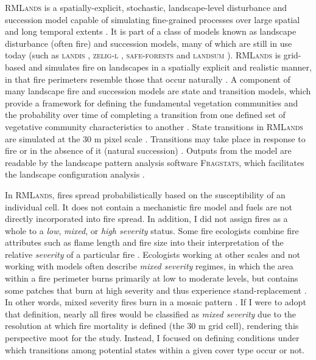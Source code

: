 \textsc{RMLands} is a spatially-explicit, stochastic, landscape-level disturbance and succession model capable of simulating fine-grained processes over large spatial and long temporal extents \citep{McGarigal2005}. It is part of a class of models known as landscape disturbance (often fire) and succession models, many of which are still in use today (such as \textsc{landis} \citep{He1999}, \textsc{zelig-l} \citep{Miller1999}, \textsc{safe-forests} \citep{Sessions1997} and \textsc{landsum} \citep{Keane2012}). \textsc{RMLands} is grid-based and simulates fire on landscapes in a spatially explicit and realistic manner, in that fire perimeters resemble those that occur naturally \citep{McGarigal2005,McGarigal2005a}. A component of many landscape fire and succession models are state and transition models, which provide a framework for defining the fundamental vegetation communities and the probability over time of completing a transition from one defined set of vegetative community characteristics to another \citep{Stringham2003,Blankenship2015}. State transitions in \textsc{RMLands} are simulated at the 30 m pixel scale \citep{Cushman2011}. Transitions may take place in response to fire or in the absence of it (natural succession) \citep{McGarigal2012}. Outputs from the model are readable by the landscape pattern analysis software \textsc{Fragstats}, which facilitates the landscape configuration analysis \citep{Fragstats2012}.

In \textsc{RMLands}, fires spread probabilistically based on the susceptibility of an individual cell. It does not contain a mechanistic fire model and fuels are not directly incorporated into fire spread. In addition, I did not assign fires as a whole to a \emph{low}, \emph{mixed}, or \emph{high severity} status. Some fire ecologists combine fire attributes such as flame length and fire size into their interpretation of the relative \emph{severity} of a particular fire \citep{Agee1993}. Ecologists working at other scales and not working with models often describe \emph{mixed severity} regimes, in which the area within a fire perimeter burns primarily at low to moderate levels, but contains some patches that burn at high severity and thus experience stand-replacement \citep{Collins2010,Kane2013}. In other words, mixed severity fires burn in a mosaic pattern \citep{Beaty2001}. If I were to adopt that definition, nearly all fires would be classified as \emph{mixed severity} due to the resolution at which fire mortality is defined (the 30 m grid cell), rendering this perspective moot for the study. Instead, I focused on defining conditions under which transitions among potential states within a given cover type occur or not. 

